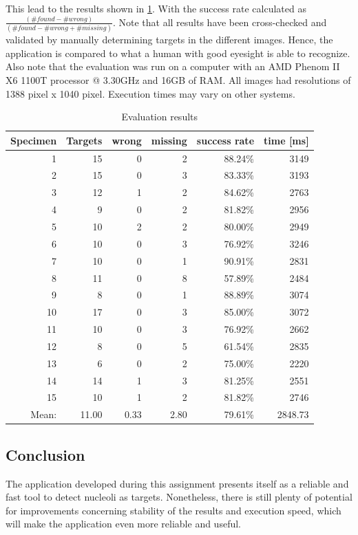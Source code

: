 \documentclass[a4paper, 12pt, twoside]{article}
\begin{document}
This lead to the results shown in \ref{tab:evaluation}. With the success rate
calculated as $\frac{(\#found - \#wrong)}{(\#found - \#wrong + \#missing)}$.
Note that all results have been cross-checked and validated by manually
determining targets in the different images. Hence, the application is compared
to what a human with good eyesight is able to recognize. Also note that the
evaluation was run on a computer with an AMD Phenom II X6 1100T processor @
3.30GHz and 16GB of RAM. All images had resolutions of 1388 pixel x 1040
pixel. Execution times may vary on other systems.

\begin{table}[h]
\centering
\begin{tabular} {r | r | r | r | r | r}
Specimen & Targets & wrong & missing & success rate & time [ms]\\
\hline
1 & 15 & 0 & 2 & 88.24\% & 3149\\
2 & 15 & 0 & 3 & 83.33\% & 3193\\
3 & 12 & 1 & 2 & 84.62\% & 2763\\
4 & 9 & 0 & 2 & 81.82\% & 2956\\
5 & 10 & 2 & 2 & 80.00\% & 2949\\
6 & 10 & 0 & 3 & 76.92\% & 3246\\
7 & 10 & 0 & 1 & 90.91\% & 2831\\
8 & 11 & 0 & 8 & 57.89\% & 2484\\
9 & 8 & 0 & 1 & 88.89\% & 3074\\
10 & 17 & 0 & 3 & 85.00\% & 3072\\
11 & 10 & 0 & 3 & 76.92\% & 2662\\
12 & 8 & 0 & 5 & 61.54\% & 2835\\
13 & 6 & 0 & 2 & 75.00\% & 2220\\
14 & 14 & 1 & 3 & 81.25\% & 2551\\
15 & 10 & 1 & 2 & 81.82\% & 2746\\
\hline
Mean: & 11.00 & 0.33 & 2.80 & 79.61\% & 2848.73\\
\end{tabular}
\caption{Evaluation results}
\label{tab:evaluation}
\end{table}

\subsection{Conclusion}
The application developed during this assignment presents itself as a reliable
and fast tool to detect nucleoli as targets. Nonetheless, there is still plenty
of potential for improvements concerning stability of the results and execution
speed, which will make the application even more reliable and useful.
\end{document}
